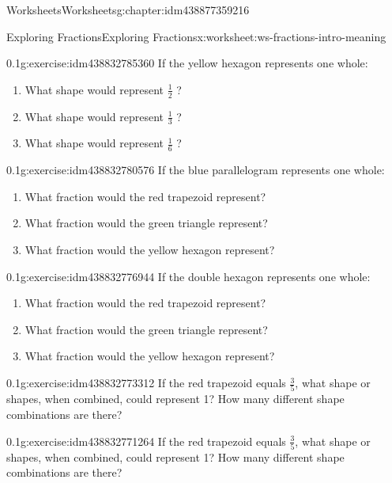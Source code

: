 \documentclass[twoside,11pt,]{book}
\begin{document}
\begin{chapterptx}{Worksheets}{}{Worksheets}{}{}{g:chapter:idm438877359216}
\begin{worksheet-section-numberless}{Exploring Fractions}{}{Exploring Fractions}{}{}{x:worksheet:ws-fractions-intro-meaning}
\begin{divisionexercise}{4}{}{0.1}{g:exercise:idm438832785360}%
If the yellow hexagon represents one whole:%
\leavevmode%
\begin{enumerate}[label=(\alph*)]
\item{}What shape would represent \(\frac{1}{2} \) ?%
\item{}What shape would represent \(\frac{1}{3} \) ?%
\item{}What shape would represent \(\frac{1}{6} \) ?%
\end{enumerate}
\end{divisionexercise}%
\begin{divisionexercise}{5}{}{0.1}{g:exercise:idm438832780576}%
If the blue parallelogram represents one whole:%
\leavevmode%
\begin{enumerate}[label=(\alph*)]
\item{}What fraction would the red trapezoid represent?%
\item{}What fraction would the green triangle represent?%
\item{}What fraction would the yellow hexagon represent?%
\end{enumerate}
\end{divisionexercise}%
\begin{divisionexercise}{6}{}{0.1}{g:exercise:idm438832776944}%
If the double hexagon represents one whole:%
\leavevmode%
\begin{enumerate}[label=(\alph*)]
\item{}What fraction would the red trapezoid represent?%
\item{}What fraction would the green triangle represent?%
\item{}What fraction would the yellow hexagon represent?%
\end{enumerate}
\end{divisionexercise}%
\begin{divisionexercise}{7}{}{0.1}{g:exercise:idm438832773312}%
If the red trapezoid equals \(\frac{3}{5} \), what shape or shapes, when combined, could represent 1?  How many different shape combinations are there?%
\end{divisionexercise}%
\begin{divisionexercise}{8}{}{0.1}{g:exercise:idm438832771264}%
If the red trapezoid equals \(\frac{3}{5} \), what shape or shapes, when combined, could represent 1?  How many different shape combinations are there?%
\end{divisionexercise}%
\begin{introduction}{}%

\end{introduction}
\end{worksheet-section-numberless}
\end{chapterptx}
\end{document}
